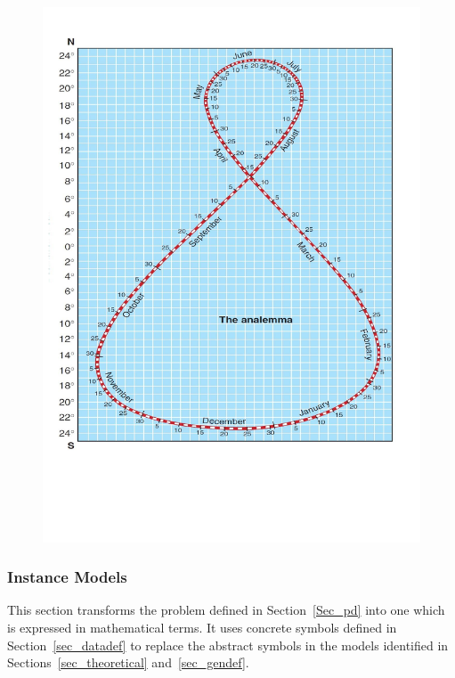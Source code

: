 \documentclass[12pt]{article}
\begin{document}
\begin{figure}[H]
  \includegraphics[scale=0.5]{Analemma.pdf}
\end{figure}


\subsubsection{Instance Models} \label{sec_instance}    

This section transforms the problem defined in Section~\ref{Sec_pd} into 
one which is expressed in mathematical terms. It uses concrete symbols defined 
in Section~\ref{sec_datadef} to replace the abstract symbols in the models 
identified in Sections~\ref{sec_theoretical} and~\ref{sec_gendef}.
\end{document}

